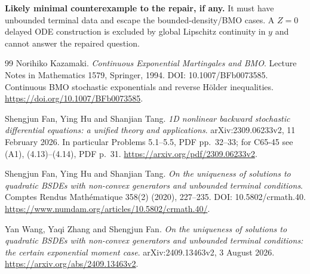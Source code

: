 \documentclass[11pt,a4paper]{article}
\theoremstyle{definition}
\begin{document}
\textbf{Likely minimal counterexample to the repair, if any.} It must have unbounded terminal data and escape the bounded-density/BMO cases. A $Z=0$ delayed ODE construction is excluded by global Lipschitz continuity in $y$ and cannot answer the repaired question.

\clearpage
\begin{thebibliography}{99}
Norihiko Kazamaki. \emph{Continuous Exponential Martingales and BMO}. Lecture Notes in Mathematics 1579, Springer, 1994. DOI: 10.1007/BFb0073585. Continuous BMO stochastic exponentials and reverse H\"older inequalities. \url{https://doi.org/10.1007/BFb0073585}.

Shengjun Fan, Ying Hu and Shanjian Tang. \emph{1D nonlinear backward stochastic differential equations: a unified theory and applications}. arXiv:2309.06233v2, 11 February 2026. In particular Problems 5.1--5.5, PDF pp.\ 32--33; for C65-45 see (A1), (4.13)--(4.14), PDF p.\ 31. \url{https://arxiv.org/pdf/2309.06233v2}.

Shengjun Fan, Ying Hu and Shanjian Tang. \emph{On the uniqueness of solutions to quadratic BSDEs with non-convex generators and unbounded terminal conditions}. Comptes Rendus Math\'ematique 358(2) (2020), 227--235. DOI: 10.5802/crmath.40. \url{https://www.numdam.org/articles/10.5802/crmath.40/}.

Yan Wang, Yaqi Zhang and Shengjun Fan. \emph{On the uniqueness of solutions to quadratic BSDEs with non-convex generators and unbounded terminal conditions: the certain exponential moment case}. arXiv:2409.13463v2, 3 August 2026. \url{https://arxiv.org/abs/2409.13463v2}.

\end{thebibliography}
\end{document}
